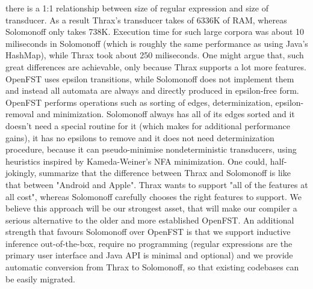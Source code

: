 there is a 1:1 relationship between size of regular expression and size of transducer. As a result Thrax's transducer takes of 6336K of RAM, whereas Solomonoff only takes 738K. Execution time for such large corpora was about 10 miliseconds in Solomonoff (which is roughly the same performance as using Java's HashMap), while Thrax took about 250 miliseconds. One might argue that, such great differences are achievable, only because Thrax supports a lot more features. OpenFST uses epsilon transitions, while Solomonoff does not implement them and instead all automata are always and directly produced in epsilon-free form. OpenFST performs operations such as sorting of edges, determinization, epsilon-removal and minimization. Solomonoff always has all of its edges sorted and it doesn't need a special routine for it (which makes for additional performance gains), it has no epsilons to remove and it does not need determinization procedure, because it can pseudo-minimise nondeterministic transducers, using heuristics inspired by Kameda-Weiner's NFA minimization. One could, half-jokingly, summarize that the difference between Thrax and Solomonoff is like that between "Android and Apple". Thrax wants to support "all of the features at all cost", whereas Solomonoff carefully chooses the right features to support. We believe this approach will be our strongest asset, that will make our compiler a serious alternative to the older and more established OpenFST. An additional strength that favours Solomonoff over OpenFST is that we support inductive inference out-of-the-box, require no programming (regular expressions are the primary user interface and Java API is minimal and optional) and we provide automatic conversion from Thrax to Solomonoff, so that existing codebases can be easily migrated.